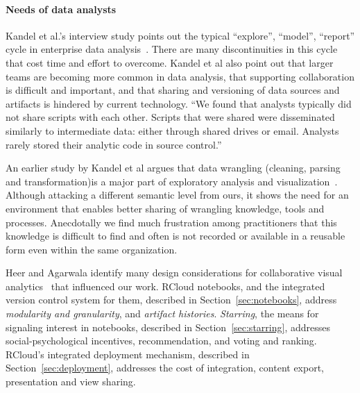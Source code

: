 \paragraph*{Needs of data analysts}
Kandel et al.'s interview study points out the typical ``explore'',
``model'', ``report'' cycle in enterprise data
analysis~\cite{Kandel:2012:EDA}. There are many discontinuities in
this cycle that cost time and effort to overcome.
Kandel et al also point out that larger teams
are becoming more common in data analysis, that supporting
collaboration is difficult and important, and that sharing
and versioning of data sources and artifacts is hindered by current
technology. ``We found that analysts typically did not
share scripts with each other. Scripts that were shared were
disseminated similarly to intermediate data: either through shared
drives or email. Analysts rarely stored their analytic code in source
control.''

An earlier study by Kandel et al argues that data wrangling
(cleaning, parsing and transformation)is a major part of exploratory
analysis and visualization~\cite{Kandel:2011:RDI}.
Although attacking a different semantic level from ours, it shows
the need for an environment that enables better sharing
of wrangling knowledge, tools and processes. Anecdotally
we find much frustration among practitioners that this knowledge
is difficult to find and often is not recorded or available in a
reusable form even within the same organization.

Heer and Agarwala identify many design considerations for
collaborative visual analytics~\cite{Heer:2008:DCF} that
influenced our work.
RCloud notebooks, and the integrated version control system for them,
described in Section~\ref{sec:notebooks}, address {\it modularity and
granularity}, and {\it artifact histories}.
\emph{Starring}, the means for signaling interest in notebooks, described in
Section~\ref{sec:starring}, addresses social-psychological incentives,
recommendation, and voting and ranking. RCloud's integrated deployment
mechanism, described in Section~\ref{sec:deployment}, addresses the cost of
integration, content export, presentation and view sharing.


